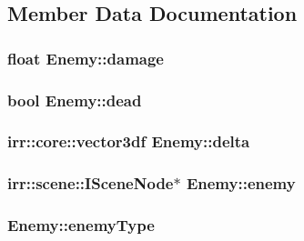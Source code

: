 \subsection{Member Data Documentation}
\hypertarget{class_enemy_a5d5917c222119c1d8eb3183c27c7adb7}{
\subsubsection[{damage}]{\setlength{\rightskip}{0pt plus 5cm}float Enemy\-::damage\hspace{0.3cm}{\ttfamily [private]}}}\label{class_enemy_a5d5917c222119c1d8eb3183c27c7adb7}
\hypertarget{class_enemy_a4b1b61e7bc79aca01f3e4b3ef19cb787}{
\subsubsection[{dead}]{\setlength{\rightskip}{0pt plus 5cm}bool Enemy\-::dead\hspace{0.3cm}{\ttfamily [private]}}}\label{class_enemy_a4b1b61e7bc79aca01f3e4b3ef19cb787}
\hypertarget{class_enemy_a2aeaae8acd857242e40db8b034566351}{
\subsubsection[{delta}]{\setlength{\rightskip}{0pt plus 5cm}irr\-::core\-::vector3df Enemy\-::delta\hspace{0.3cm}{\ttfamily [private]}}}\label{class_enemy_a2aeaae8acd857242e40db8b034566351}
\hypertarget{class_enemy_a4befe0ced393215de590152256bf1ee4}{
\subsubsection[{enemy}]{\setlength{\rightskip}{0pt plus 5cm}irr\-::scene\-::\-I\-Scene\-Node$\ast$ Enemy\-::enemy\hspace{0.3cm}{\ttfamily [private]}}}\label{class_enemy_a4befe0ced393215de590152256bf1ee4}
\hypertarget{class_enemy_a36bcaf317708c0ed35835bc0f79c7719}{
\subsubsection[{enemy\-Type}]{ Enemy\-::enemy\-Type\hspace{0.3cm}{\ttfamily [private]}}}\label{class_enemy_a36bcaf317708c0ed35835bc0f79c7719}

